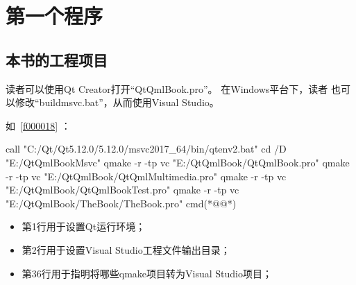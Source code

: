 ﻿




%

\FloatBarrier
\section{
第一个程序
}\label{s100210}


\FloatBarrier
\subsection{
本书的工程项目
}\label{ss001u10}


读者可以使用Qt Creator打开“QtQmlBook.pro”。
在Windows平台下，读者
也可以修改“build\underline{\hspace{0.5em}}msvc.bat”，从而使用Visual Studio。

如\filesourcenumbernameone\ \ref{f000018} ：


\label{f000018}    %
\FloatBarrier                                  %
\begin{thebookfilesourceone}[escapeinside={(*@}{@*)},
caption=GoodLuck,
title=\filesourcenumbernameone \thefilesourcenumber
]
call "C:/Qt/Qt5.12.0/5.12.0/msvc2017_64/bin/qtenv2.bat"
cd /D "E:/QtQmlBookMsvc"
qmake -r -tp vc "E:/QtQmlBook/QtQmlBook.pro"
qmake -r -tp vc "E:/QtQmlBook/QtQmlMultimedia.pro"
qmake -r -tp vc "E:/QtQmlBook/QtQmlBookTest.pro"
qmake -r -tp vc "E:/QtQmlBook/TheBook/TheBook.pro"
cmd(*@\marginpar[\hfill\setlength\fboxsep{2pt}\fbox{\footnotesize{\kaishu\parbox{1em}{\setlength{\baselineskip}{2pt}\filesourcenumbernameone}}\footnotesize{\thefilesourcenumber}}]{\setlength\fboxsep{2pt}\fbox{\footnotesize{\kaishu\parbox{1em}{\setlength{\baselineskip}{2pt}\filesourcenumbernameone}}\footnotesize{\thefilesourcenumber}}}@*)\end{thebookfilesourceone}          %
\addtocounter{lstlisting}{-1}   %



\begin{itemize}

\item 第1行用于设置Qt运行环境；
\item 第2行用于设置Visual Studio工程文件输出目录；
\item 第3\raisebox{0.16ex}{\sourcefonttwo\~{}}6行用于指明将哪些qmake项目转为Visual Studio项目；

\end{itemize}

